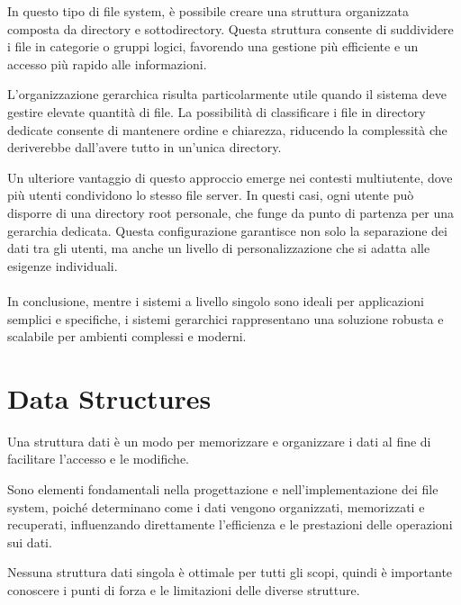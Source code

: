 \documentclass[12pt,a4paper,openright,twoside]{book}
\begin{document}
            In questo tipo di file system, è possibile creare una struttura organizzata composta da directory e sottodirectory. Questa struttura consente di suddividere i file in categorie o gruppi logici, favorendo una gestione più efficiente e un accesso più rapido alle informazioni.

            L'organizzazione gerarchica risulta particolarmente utile quando il sistema deve gestire elevate quantità di file. La possibilità di classificare i file in directory dedicate consente di mantenere ordine e chiarezza, riducendo la complessità che deriverebbe dall'avere tutto in un'unica directory.

            Un ulteriore vantaggio di questo approccio emerge nei contesti multiutente, dove più utenti condividono lo stesso file server. In questi casi, ogni utente può disporre di una directory root personale, che funge da punto di partenza per una gerarchia dedicata. Questa configurazione garantisce non solo la separazione dei dati tra gli utenti, ma anche un livello di personalizzazione che si adatta alle esigenze individuali.

        \paragraph*{}

            In conclusione, mentre i sistemi a livello singolo sono ideali per applicazioni semplici e specifiche, i sistemi gerarchici rappresentano una soluzione robusta e scalabile per ambienti complessi e moderni.

        \cite{tanenbaum2015modern}

    \section{Data Structures}

        Una struttura dati è un modo per memorizzare e organizzare i dati al fine di facilitare l'accesso e le modifiche.

        Sono elementi fondamentali nella progettazione e nell'implementazione dei file system, poiché determinano come i dati vengono organizzati, memorizzati e recuperati, influenzando direttamente l'efficienza e le prestazioni delle operazioni sui dati.

        Nessuna struttura dati singola è ottimale per tutti gli scopi, quindi è importante conoscere i punti di forza e le limitazioni delle diverse strutture.
\end{document}
